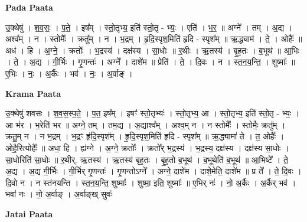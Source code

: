 \documentclass[17pt]{extarticle}
\begin{document}
\textbf{Pada Paata} \newline

उ॒क्थेषु॑ । श॒व॒सः॒ । प॒ते॒ । इष᳚म् । स्तो॒तृभ्य॒ इति॑ स्तो॒तृ - भ्यः॒ । एति॑ । भ॒र॒ ॥ अग्ने᳚ । तम् । अ॒द्य । अश्व᳚म् । न । स्तोमैः᳚ । क्रतु᳚म् । न । भ॒द्रम् । हृ॒दि॒स्पृश॒मिति॑ हृदि - स्पृश᳚म् ॥ ऋ॒द्ध्याम॑ । ते॒ । ओहैः᳚ ॥ अध॑ । हि । अ॒ग्ने॒ । क्रतोः᳚ । भ॒द्रस्य॑ । दक्ष॑स्य । सा॒धोः ॥ र॒थीः । ऋ॒तस्य॑ । बृ॒ह॒तः । ब॒भूथ॑ ॥ आ॒भिः । ते॒ । अ॒द्य । गी॒र्भिः । गृ॒णन्तः॑ । अग्ने᳚ । दाशे॑म ॥ प्रेति॑ । ते॒ । दि॒वः । न । स्त॒न॒य॒न्ति॒ । शुष्माः᳚ ॥ ए॒भिः । नः॒ । अ॒र्कैः । भव॑ । नः॒ । अ॒र्वाङ् ।  \newline


\textbf{Krama Paata} \newline

उ॒क्थेषु॑ शवसः । श॒व॒स॒स्प॒ते॒ । प॒त॒ इष᳚म् । इषꣳ॑ स्तो॒तृभ्यः॑ । स्तो॒तृभ्य॒ आ । स्तो॒तृभ्य॒ इति॑ स्तो॒तृ - भ्यः॒ । आ भ॑र । भ॒रेति॑ भर ॥ अग्ने॒ तम् । तम॒द्य । अ॒द्याश्व᳚म् । अश्व॒म् न । न स्तोमैः᳚ । स्तोमैः॒ क्रतु᳚म् । क्रतु॒म् न । न भ॒द्रम् । भ॒द्रꣳ हृ॑दि॒स्पृश᳚म् । हृ॒दि॒स्पृश॒मिति॑ हृदि - स्पृश᳚म् ॥ ऋ॒द्ध्यामा॑ ते । त॒ ओहैः᳚ । ओहै॒रित्योहैः᳚ ॥ अधा॒ हि । ह्य॑ग्ने । अ॒ग्ने॒ क्रतोः᳚ । क्रतो᳚र् भ॒द्रस्य॑ । भ॒द्रस्य॒ दक्ष॑स्य । दक्ष॑स्य सा॒धोः । सा॒धोरिति॑ सा॒धोः ॥ र॒थीर्. ऋ॒तस्य॑ । ऋ॒तस्य॑ बृह॒तः । बृ॒ह॒तो ब॒भूथ॑ । ब॒भूथेति॑ ब॒भूथ॑ ॥ आ॒भिष्टे᳚ । ते॒ अ॒द्य । अ॒द्य गी॒र्भिः । गी॒र्भिर् गृ॒णन्तः॑ । गृ॒णन्तोऽग्ने᳚ । अग्ने॒ दाशे॑म । दाशे॒मेति॒ दाशे॑म ॥ प्र ते᳚ । ते॒ दि॒वः । दि॒वो न । न स्त॑नयन्ति । स्त॒न॒य॒न्ति॒ शुष्माः᳚ । शुष्मा॒ इति॒ शुष्माः᳚ ॥ ए॒भिर् नः॑ । नो॒ अ॒र्कैः । अ॒र्कैर् भव॑ । भवा॑ नः । नो॒ अ॒र्वाङ् । अ॒र्वाङ्ख् सुवः॑ \newline

\textbf{Jatai Paata} \newline
\end{document}
